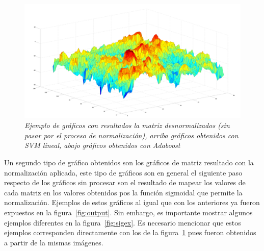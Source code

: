 \begin{figure}[htc]
  \includegraphics[scale=.1]{images/raw/4}
  \caption{\em Ejemplo de gráficos con resultados la matriz desnormalizados (sin pasar por el proceso de normalización), arriba gráficos obtenidos con SVM lineal, abajo gráficos obtenidos con Adaboost}  
  \label{fig:rawex}
\end{figure}

Un segundo tipo de gráfico obtenidos son los gráficos de matriz resultado con la normalización aplicada, este tipo de gráficos son en general el siguiente paso respecto de los gráficos sin procesar son el resultado de mapear los valores de cada matriz en los valores obtenidos pos la función sigmoidal que permite la normalización. Ejemplos de estos gráficos al igual que con los anteriores ya fueron expuestos en la figura~\ref{fig:output}. Sin embargo, es importante mostrar algunos ejemplos diferentes en la figura~\ref{fig:sigex}. Es necesario mencionar que estos ejemplos corresponden directamente con los de la figura~\ref{fig:rawex} pues fueron obtenidos a partir de la mismas imágenes.



